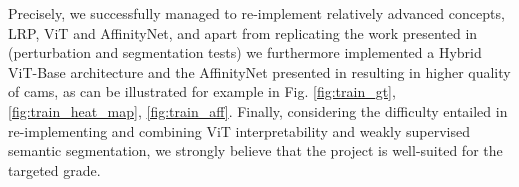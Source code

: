 \documentclass{article}
\begin{document}

Precisely, we successfully managed to re-implement relatively advanced concepts, LRP, ViT and AffinityNet, and apart from replicating the work presented in \cite{mainpaper} (perturbation and segmentation tests) we furthermore implemented a Hybrid ViT-Base architecture and the AffinityNet presented in \cite{ahn2018learning} resulting in higher quality of cams, as can be illustrated for example in Fig. \ref{fig:train_gt}, \ref{fig:train_heat_map}, \ref{fig:train_aff}. Finally, considering the difficulty entailed in re-implementing and combining ViT interpretability and weakly supervised semantic segmentation, we strongly believe that the project is well-suited for the targeted grade.












\end{document}
